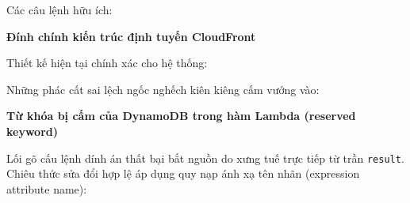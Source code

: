Các câu lệnh hữu ích:

\begin{Shaded}
\begin{Highlighting}[]
\OperatorTok{=}
\end{Highlighting}
\end{Shaded}

\vspace{0.5em}\noindent\textbf{Đính chính kiến trúc định tuyến
CloudFront}\par

Thiết kế hiện tại chính xác cho hệ thống:

\begin{Shaded}
\begin{Highlighting}[]
\end{Highlighting}
\end{Shaded}

Những phác cất sai lệch ngốc nghếch kiên kiêng cấm vướng vào:

\begin{Shaded}
\begin{Highlighting}[]
\end{Highlighting}
\end{Shaded}

\vspace{0.5em}\noindent\textbf{Từ khóa bị cấm của DynamoDB trong hàm Lambda (reserved
keyword)}\par

Lối gõ cấu lệnh dính án thất bại bắt nguồn do xưng tuế trực tiếp từ trần
\texttt{result}. Chiêu thức sửa đổi hợp lệ áp dụng quy nạp ánh xạ tên
nhãn (expression attribute name):

